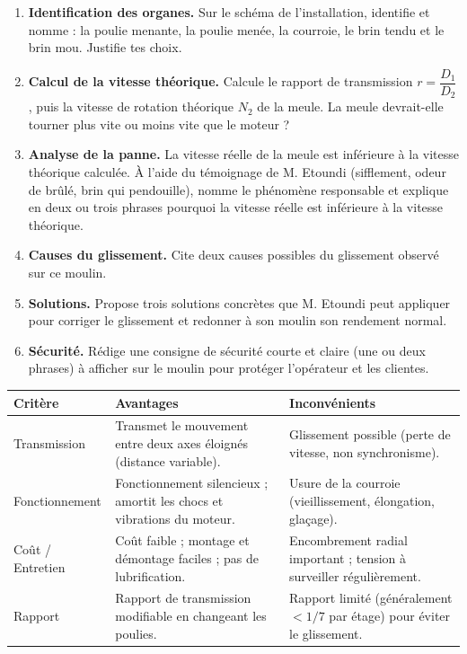 \documentclass[11pt]{article}
\newcounter{popsec}
\newcounter{popsub}
\newcommand{\courssub}[1]{%
  \stepcounter{popsub}%
  \par\vspace{9pt}\noindent{\popxbold\fontsize{11.5}{13}\selectfont\color{popink}{\color{poporange}\thepopsec.\thepopsub}\hspace{6pt}#1}\par\nopagebreak\vspace{4pt}
}
\begin{document}
\begin{enumerate}
\item \textbf{Identification des organes.} Sur le schéma de l'installation, identifie et nomme : la poulie menante, la poulie menée, la courroie, le brin tendu et le brin mou. Justifie tes choix.
\item \textbf{Calcul de la vitesse théorique.} Calcule le rapport de transmission $r = \dfrac{D_1}{D_2}$, puis la vitesse de rotation théorique $N_2$ de la meule. La meule devrait-elle tourner plus vite ou moins vite que le moteur ?
\item \textbf{Analyse de la panne.} La vitesse réelle de la meule est inférieure à la vitesse théorique calculée. À l'aide du témoignage de M. Etoundi (sifflement, odeur de brûlé, brin qui pendouille), nomme le phénomène responsable et explique en deux ou trois phrases pourquoi la vitesse réelle est inférieure à la vitesse théorique.
\item \textbf{Causes du glissement.} Cite deux causes possibles du glissement observé sur ce moulin.
\item \textbf{Solutions.} Propose trois solutions concrètes que M. Etoundi peut appliquer pour corriger le glissement et redonner à son moulin son rendement normal.
\item \textbf{Sécurité.} Rédige une consigne de sécurité courte et claire (une ou deux phrases) à afficher sur le moulin pour protéger l'opérateur et les clientes.
\end{enumerate}

\courssub{Ressources à mobiliser}

\begin{propriete}
\begin{center}
\begin{tabularx}{\linewidth}{|l|X|X|}\hline
\rowcolor{popblueL}
\textbf{Critère} & \textbf{Avantages} & \textbf{Inconvénients} \\ \hline
Transmission & Transmet le mouvement entre deux axes éloignés (distance variable). & Glissement possible (perte de vitesse, non synchronisme). \\ \hline
Fonctionnement & Fonctionnement silencieux ; amortit les chocs et vibrations du moteur. & Usure de la courroie (vieillissement, élongation, glaçage). \\ \hline
Coût / Entretien & Coût faible ; montage et démontage faciles ; pas de lubrification. & Encombrement radial important ; tension à surveiller régulièrement. \\ \hline
Rapport & Rapport de transmission modifiable en changeant les poulies. & Rapport limité (généralement $< 1/7$ par étage) pour éviter le glissement. \\ \hline
\end{tabularx}
\end{center}
\end{propriete}
\end{document}
